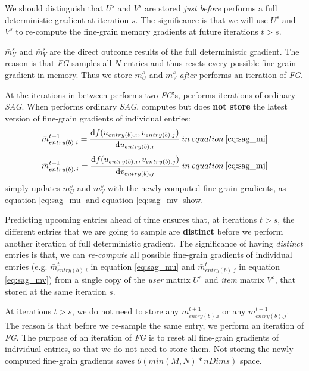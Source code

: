 We should distinguish that $U^{s}$ and $V^{s}$ are stored \emph{just before} \tool performs a full deterministic gradient at iteration $s$.
The significance is that we will use $U^{s}$ and $V^{s}$ to re-compute the fine-grain memory gradients at future iterations $t > s$.

$\bar{m}_{U}^{s}$ and $\bar{m}_{V}^{s}$ are the direct outcome results of the full deterministic gradient.  
The reason is that \emph{FG} samples all $N$ entries and thus resets every possible fine-grain gradient in memory.
Thus we store $\bar{m}_{U}^{s}$ and $\bar{m}_{V}^{s}$ \emph{after} \tool performs an iteration of \emph{FG}.

At the iterations in between \tool performs two \emph{FG}'s, \tool performs iterations of ordinary \emph{SAG}.
When \tool performs ordinary \emph{SAG}, \tool computes but does \textbf{not store} the latest version of fine-grain gradients of individual entries: 
\[
\bar{m}_{entry(b).i}^{t+1} = \frac{\text{d}f(\bar{u}_{entry(b).i}, \bar{v}_{entry(b).j})}{\text{d}\bar{u}_{entry(b).i}}\:in\:equation\:\ref{eq:sag_mi}
\]
\[
\bar{m}_{entry(b).j}^{t+1} = \frac{\text{d}f(\bar{u}_{entry(b).i}, \bar{v}_{entry(b).j})}{\text{d}\bar{v}_{entry(b).j}}\:in\:equation\:\ref{eq:sag_mj}
\]
\tool simply updates $\bar{m}_{U}^{s}$ and $\bar{m}_{V}^{s}$ with the newly computed fine-grain gradients, as equation \ref{eq:sag_mu} and equation \ref{eq:sag_mv} show.

Predicting upcoming entries ahead of time ensures that, at iterations $t > s$, 
the different entries that we are going to sample are \textbf{distinct} before we perform another iteration of full deterministic gradient.
The significance of having \emph{distinct} entries is that, we can \emph{re-compute} all possible fine-grain gradients of individual entries 
(e.g. $\bar{m}_{entry(b).i}^{t}$ in equation \ref{eq:sag_mu} and $\bar{m}_{entry(b).j}^{t}$ in equation \ref{eq:sag_mv}) 
from a single copy of the \emph{user} matrix $U^{s}$ and \emph{item} matrix $V^{s}$, that \tool stored at the same iteration $s$.

At iterations $t > s$, we do not need to store any $\bar{m}_{entry(b).i}^{t+1}$ or any $\bar{m}_{entry(b).j}^{t+1}$.
The reason is that before we re-sample the same entry, we perform an iteration of \emph{FG}.
The purpose of an iteration of \emph{FG} is to reset all fine-grain gradients of individual entries, so that we do not need to store them.
Not storing the newly-computed fine-grain gradients saves $\theta(min(M,N)*nDims)$ space.


